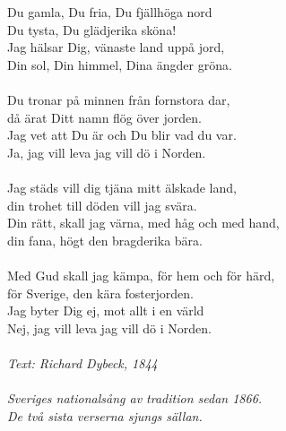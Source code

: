 \vspace{10pt}
Du gamla, Du fria, Du fjällhöga nord\\
Du tysta, Du glädjerika sköna!\\
Jag hälsar Dig, vänaste land uppå jord,\\
\revrpt Din sol, Din himmel, Dina ängder gröna.\rpt\\
\\
Du tronar på minnen från fornstora dar,\\
då ärat Ditt namn flög över jorden.\\
Jag vet att Du är och Du blir vad du var.\\
\revrpt Ja, jag vill leva jag vill dö i Norden.\rpt\\
\\
Jag städs vill dig tjäna mitt älskade land,\\
din trohet till döden vill jag svära.\\
Din rätt, skall jag värna, med håg och med hand,\\
\revrpt din fana, högt den bragderika bära.\rpt\\
\\
Med Gud skall jag kämpa, för hem och för härd,\\
för Sverige, den kära fosterjorden.\\
Jag byter Dig ej, mot allt i en värld\\
\revrpt Nej, jag vill leva jag vill dö i Norden.\rpt\\
\\
{\footnotesize\textit{Text: Richard Dybeck, 1844\\
\\
Sveriges nationalsång av tradition sedan 1866.\\
De två sista verserna sjungs sällan.}}
\clearpage
